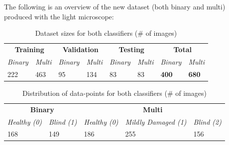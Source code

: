 \documentclass[a4paper]{article}
\begin{document}
            The following is an overview of the new dataset (both binary and multi) produced with the light microscope:
            \begin{table}[h]
                \centering
                    \begin{tabular}{||l l|l l|l l|l l||}
                    \hline
                        \multicolumn{2}{c}{\textbf{Training}} &
                        \multicolumn{2}{c}{\textbf{Validation}} &
                        \multicolumn{2}{c}{\textbf{Testing}} &
                        \multicolumn{2}{c}{\textbf{Total}}\\
                        {\textit{Binary}} & {\textit{Multi}} & \textit{{Binary}} & \textit{{Multi}} & \textit{{Binary}} & \textit{{Multi}} & \textit{{Binary}} & \textit{{Multi} } \\
                        \hline\hline
                        222 & 463 & 95 & 134 & 83 & 83 & \textbf{400} & \textbf{680} \\
                    \hline
                    \end{tabular}
                    \caption{\label{fig:4} Dataset sizes for both classifiers (\# of images)}
            \end{table}

            \nopagebreak

                \begin{table}[h]
                    \centering
                        \begin{tabular}{||l l|l l l||}
                        \hline
                            \multicolumn{2}{c}{\textbf{Binary}} &
                            \multicolumn{3}{c}{\textbf{Multi}} \\
                            {\textit{Healthy (0)}} & {\textit{Blind (1)}} & \textit{{Healthy (0)}} & \textit{{Mildly Damaged (1)}} & \textit{{Blind (2)}} \\
                            \hline\hline
                            168 & 149 & 186 & 255 & 156 \\
                        \hline
                        \end{tabular}
                        \caption{\label{fig:4} Distribution of data-points for both classifiers (\# of images)}
                \end{table}
\end{document}
